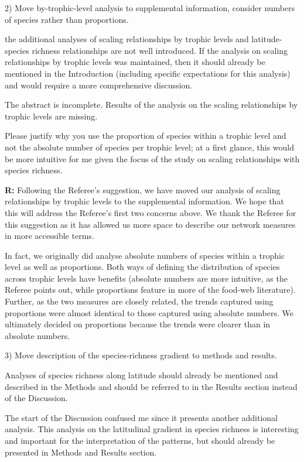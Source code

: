 \documentclass[12pt]{letter}
\newenvironment{refquote}{\bigskip \begin{it}}{\end{it}\smallskip}
\begin{document}
  2) Move by-trophic-level analysis to supplemental information, consider
  numbers of species rather than proportions.

  \begin{refquote}

    the additional analyses of scaling relationships by trophic levels and
    latitude-species richness relationships are not well introduced. If the
    analysis on scaling relationships by trophic levels was maintained, then
    it should already be mentioned in the Introduction (including specific
    expectations for this analysis) and would require a more comprehensive
    discussion.

    \smallskip

    The abstract is incomplete. Results of the analysis on the scaling
    relationships by trophic levels are missing.

    \smallskip

    Please justify why you use the proportion of species within a trophic
    level and not the absolute number of species per trophic level; at a first
    glance, this would be more intuitive for me given the focus of the study
    on scaling relationships with species richness.

  \end{refquote}


  \textbf{R:} Following the Referee's suggestion, we have moved our analysis
  of scaling relationships by trophic levels to the supplemental information.
  We hope that this will address the Referee's first two concerns above. We thank the
  Referee for this suggestion as it has allowed us more space to describe our network
  measures in more accessible terms.


  In fact, we originally did analyse absolute numbers of species within a trophic level as well 
  as proportions. Both ways of defining the distribution of species across trophic levels
  have benefits (absolute numbers are more intuitive, as the Referee points out, while
  proportions feature in more of the food-web literature).
  Further, as the two measures are closely related, the
  trends captured using proportions were almost identical
  to those captured using absolute numbers. We ultimately
  decided on proportions because the trends were clearer 
  than in absolute numbers. 


  3) Move description of the species-richness gradient to methods and results.


  \begin{refquote}

     Analyses of species richness along latitude should already be mentioned
     and described in the Methods and should be referred to in the Results
     section instead of the Discussion.

     \smallskip

      The start of the Discussion confused me since it presents another
      additional analysis. This analysis on the latitudinal gradient in
      species richness is interesting and important for the interpretation of
      the patterns, but should already be presented in Methods and Results
      section.

  \end{refquote}
\end{document}
